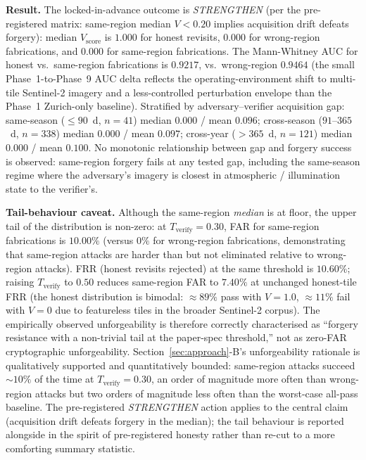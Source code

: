 \documentclass[journal,10pt,twocolumn]{IEEEtran}
\begin{document}
\textbf{Result.} The locked-in-advance outcome is \emph{STRENGTHEN} (per the pre-registered matrix: same-region median $V<0.20$ implies acquisition drift defeats forgery): median $V_\text{score}$ is $1.000$ for honest revisits, $0.000$ for wrong-region fabrications, and $0.000$ for same-region fabrications. The Mann-Whitney AUC for honest vs.\ same-region fabrications is $0.9217$, vs.\ wrong-region $0.9464$ (the small Phase~1-to-Phase~9 AUC delta reflects the operating-environment shift to multi-tile Sentinel-2 imagery and a less-controlled perturbation envelope than the Phase~1 Zurich-only baseline). Stratified by adversary--verifier acquisition gap: same-season ($\leq 90$~d, $n=41$) median $0.000$ / mean $0.096$; cross-season ($91$--$365$~d, $n=338$) median $0.000$ / mean $0.097$; cross-year ($>365$~d, $n=121$) median $0.000$ / mean $0.100$. No monotonic relationship between gap and forgery success is observed: same-region forgery fails at any tested gap, including the same-season regime where the adversary's imagery is closest in atmospheric / illumination state to the verifier's.

\textbf{Tail-behaviour caveat.} Although the same-region \emph{median} is at floor, the upper tail of the distribution is non-zero: at $T_\text{verify}=0.30$, FAR for same-region fabrications is $10.00\%$ (versus $0\%$ for wrong-region fabrications, demonstrating that same-region attacks are harder than but not eliminated relative to wrong-region attacks). FRR (honest revisits rejected) at the same threshold is $10.60\%$; raising $T_\text{verify}$ to $0.50$ reduces same-region FAR to $7.40\%$ at unchanged honest-tile FRR (the honest distribution is bimodal: $\approx 89\%$ pass with $V=1.0$, $\approx 11\%$ fail with $V=0$ due to featureless tiles in the broader Sentinel-2 corpus). The empirically observed unforgeability is therefore correctly characterised as ``forgery resistance with a non-trivial tail at the paper-spec threshold,'' not as zero-FAR cryptographic unforgeability. Section~\ref{sec:approach}-B's unforgeability rationale is qualitatively supported and quantitatively bounded: same-region attacks succeed $\sim 10\%$ of the time at $T_\text{verify}=0.30$, an order of magnitude more often than wrong-region attacks but two orders of magnitude less often than the worst-case all-pass baseline. The pre-registered \emph{STRENGTHEN} action applies to the central claim (acquisition drift defeats forgery in the median); the tail behaviour is reported alongside in the spirit of pre-registered honesty rather than re-cut to a more comforting summary statistic.
\end{document}
